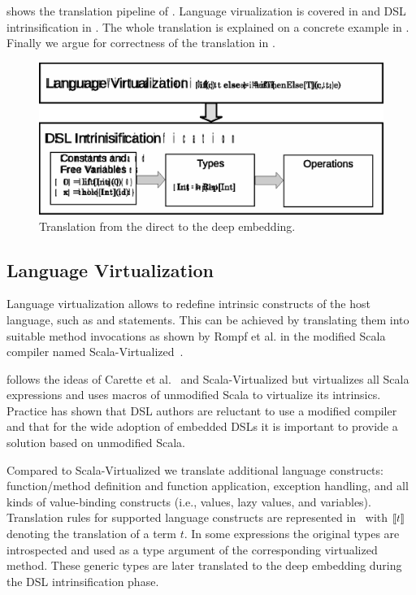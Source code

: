  shows the translation pipeline of \yy. Language virualization is covered
in  and DSL intrinsification
in . The whole translation is explained on a concrete example
in . Finally we argue for correctness of the translation
in .

\begin{figure}
\centering
\includegraphics{diagrams/pipeline.eps}
\caption{Translation from the direct to the deep embedding.}
\label{fig:pipeline}
\end{figure}

\subsection{Language Virtualization}
\label{sec:langauge-virtualization}
Language virtualization allows to redefine intrinsic constructs of the
host language, such as  and  statements. This can be
achieved by translating them into suitable method invocations as shown by Rompf
et al. in the modified Scala compiler named Scala-Virtualized~\cite{rompf_scala-virtualized:_2009}.

 \yy follows the ideas of Carette et al.~\cite{carette_finally_2009}
 and Scala-Virtualized but virtualizes all Scala expressions and uses macros of
  unmodified Scala to virtualize its intrinsics. Practice has shown that DSL
  authors are reluctant to use a modified compiler and that for the wide adoption
  of embedded DSLs it is important to provide a solution based on unmodified Scala.

 Compared to Scala-Virtualized we translate additional language constructs:
  function/method definition and function application, exception handling, and all kinds of value-binding constructs
  (i.e., values, lazy values, and variables). Translation rules for supported language constructs are
  represented in~ with $\llbracket t \rrbracket$ denoting the translation of a term $t$. In some expressions
  the original types are introspected and used as a type argument of the corresponding virtualized method. These
  generic types are later translated to the deep embedding during the DSL intrinsification phase.

